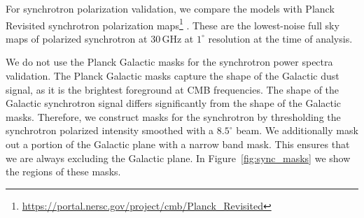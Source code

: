 \documentclass[twocolumn]{aastex631}
\newcommand{\giuse}[1]{\textcolor{orange}{(GP: #1)}}
\begin{document}

For synchrotron polarization validation, we compare the models with Planck Revisited synchrotron polarization maps\footnote{\url{https://portal.nersc.gov/project/cmb/Planck\_Revisited}} \citep{Delabrouille:2024}. These are the lowest-noise full sky maps of polarized synchrotron at 30\,GHz at $1^\circ$ resolution at the time of analysis. 

We do not use the Planck Galactic masks for the synchrotron power spectra validation. The Planck Galactic masks capture the shape of the Galactic dust signal, as it is the brightest foreground at CMB frequencies. The shape of the Galactic synchrotron signal differs significantly from the shape of the Galactic masks. Therefore, we construct masks for the synchrotron by thresholding the synchrotron polarized intensity smoothed with a $8.5^\circ$ beam. We additionally mask out a portion of the Galactic plane with a narrow band mask. This ensures that we are always excluding the Galactic plane. In Figure~\ref{fig:sync_masks} we show the regions of these masks. 
\end{document}
